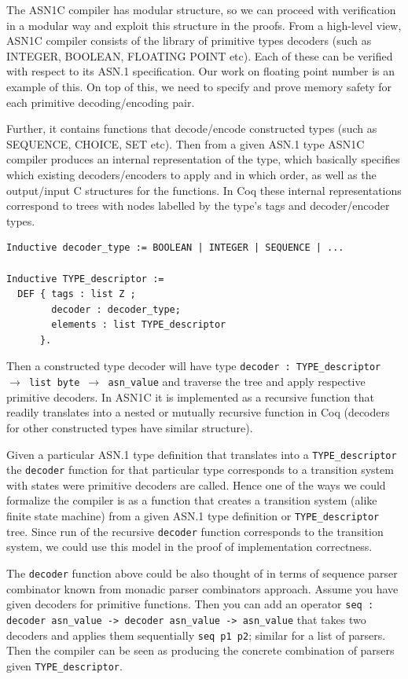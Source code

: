 \documentclass[acmsmall,nonacm]{acmart}
\begin{document}
The ASN1C compiler has modular structure, so we can proceed with
verification in a modular way and exploit this structure in the
proofs. From a high-level view, ASN1C compiler consists of
the library of primitive types decoders (such as INTEGER, BOOLEAN,
FLOATING POINT etc). Each of these can be verified with respect to its
ASN.1 specification. Our work on floating point number is an example
of this. On top of this, we need to specify and prove memory safety
for each primitive decoding/encoding pair.

Further, it contains functions that decode/encode
constructed types (such as SEQUENCE, CHOICE, SET etc). Then from a
given ASN.1 type ASN1C compiler produces an internal
representation of the type, which basically specifies which existing
decoders/encoders to apply and in which order, as well as the
output/input C structures for the functions. In Coq
these internal representations correspond to trees with nodes labelled by the
type's tags and decoder/encoder types.

 \begin{lstlisting}[language=Coq]
Inductive decoder_type := BOOLEAN | INTEGER | SEQUENCE | ...

Inductive TYPE_descriptor :=
  DEF { tags : list Z ;
        decoder : decoder_type;
        elements : list TYPE_descriptor 
      }.
 \end{lstlisting}

 Then a constructed type decoder will have type \texttt{decoder : TYPE\_descriptor $\rightarrow$ list byte $\rightarrow$ asn\_value}  and traverse the tree and apply
 respective primitive decoders. In ASN1C it is implemented as
 a recursive function that readily translates into a nested or mutually recursive
 function in Coq (decoders for other constructed types have similar
 structure).

 Given a particular ASN.1 type definition that translates into a
 \texttt{TYPE\_descriptor} the \texttt{decoder} function for that
 particular type corresponds to a transition system with states were
 primitive decoders are called. Hence one of the ways we could
 formalize the compiler is as a function that creates a transition
 system (alike finite state machine) from a given ASN.1 type
 definition or \texttt{TYPE\_descriptor} tree. Since run of the
 recursive \texttt{decoder} function corresponds to the transition
 system, we could use this model in the proof of implementation
 correctness.

 The \texttt{decoder} function above could be also thought of in terms
 of sequence parser combinator known from monadic parser combinators
 approach\cite{MPC}. Assume you have given decoders for primitive
 functions. Then you can add an operator \texttt{seq : decoder
   asn\_value -> decoder asn\_value -> asn\_value} that takes two
 decoders and applies them sequentially \texttt{seq p1 p2}; similar for a
 list of parsers. Then the compiler can be seen as producing the
 concrete combination of parsers given \texttt{TYPE\_descriptor}.
\end{document}
